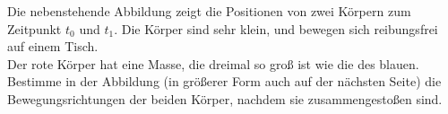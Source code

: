 \begin{minipage}[b]{0.6\textwidth}
\begin{Exercise}[label = col1, title = Stoßaufnahme, origin = Aaron Wild, difficulty = 5]
	Die nebenstehende Abbildung zeigt die Positionen von zwei Körpern zum Zeitpunkt $t_0$ und $t_1$. Die Körper sind sehr klein, und bewegen sich reibungsfrei auf einem Tisch.\\
	Der rote Körper hat eine Masse, die dreimal so groß ist wie die des blauen.\\
	Bestimme in der Abbildung (in größerer Form auch auf der nächsten Seite) die Bewegungsrichtungen der beiden Körper, nachdem sie zusammengestoßen sind.
\end{Exercise}
\end{minipage}
\begin{minipage}[b]{0.4\textwidth}
	\flushright
	
\end{minipage}